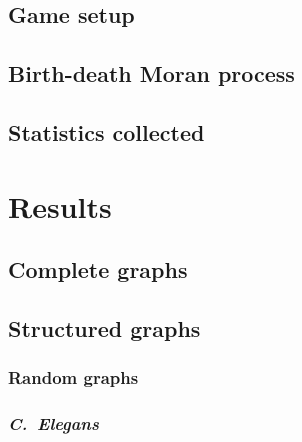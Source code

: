 \documentclass[openacc]{class/rsprocb_new}
\begin{document}
\subsection{Game setup}
\subsection{Birth-death Moran process}
\subsection{Statistics collected}

\section{Results}
\subsection{Complete graphs}
\subsection{Structured graphs}
\subsubsection{Random graphs}
\subsubsection{\emph{C.\ Elegans}}
\end{document}
